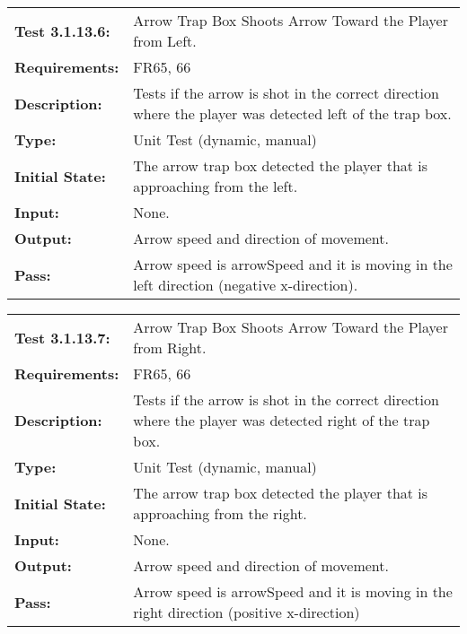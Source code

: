 \documentclass[12pt, titlepage]{article}
\begin{document}
\begin{tabular}{|l|p{10cm}|}
    \hline
    \bf{Test} 3.1.13.6: & Arrow Trap Box Shoots Arrow Toward the Player from Left.\\
    \bf{Requirements}: & FR65, 66\\
    \bf{Description}: & Tests if the arrow is shot in the correct direction where the player was detected left of the trap box.\\
    \bf{Type}: & Unit Test (dynamic, manual) \\
    \bf{Initial State}: & The arrow trap box detected the player that is approaching from the left.\\
    \bf{Input}: & None.\\
    \bf{Output}: & Arrow speed and direction of movement.\\
    \bf{Pass}: & Arrow speed is arrowSpeed and it is moving in the left direction (negative x-direction). \\
    \hline
\end{tabular}

\begin{tabular}{|l|p{10cm}|}
    \hline
    \bf{Test} 3.1.13.7: & Arrow Trap Box Shoots Arrow Toward the Player from Right.\\
    \bf{Requirements}: & FR65, 66\\
    \bf{Description}: & Tests if the arrow is shot in the correct direction where the player was detected right of the trap box. \\
    \bf{Type}: & Unit Test (dynamic, manual) \\
    \bf{Initial State}: & The arrow trap box detected the player that is approaching from the right. \\
    \bf{Input}: & None. \\
    \bf{Output}: & Arrow speed and direction of movement. \\
    \bf{Pass}: & Arrow speed is arrowSpeed and it is moving in the right direction (positive x-direction) \\
    \hline
\end{tabular}

\end{document}
